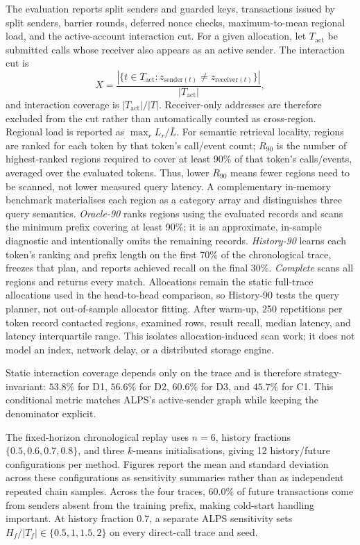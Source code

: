 \documentclass[runningheads]{llncs}
\begin{document}
The evaluation reports split senders and guarded keys, transactions issued by
split senders, barrier rounds, deferred nonce checks, maximum-to-mean regional
load, and the active-account interaction cut. For a given allocation, let
$T_{\mathrm{act}}$ be submitted calls whose receiver also appears as an active sender.
The interaction cut is
\[
X=\frac{|\{t\in T_{\mathrm{act}}:z_{\mathrm{sender}(t)}\neq
z_{\mathrm{receiver}(t)}\}|}{|T_{\mathrm{act}}|},
\]
and interaction coverage is $|T_{\mathrm{act}}|/|T|$. Receiver-only addresses
are therefore excluded from the cut rather than automatically counted as
cross-region. Regional load is reported as $\max_r L_r/\bar L$. For semantic
retrieval locality, regions are ranked for each token by that token's call/event
count; $R_{90}$ is the number of highest-ranked regions required to cover at
least 90\% of that token's calls/events, averaged over the evaluated tokens. Thus,
lower $R_{90}$ means fewer regions need to be scanned, not lower measured query
latency. A complementary in-memory benchmark materialises each region as a
category array and distinguishes three query semantics. \emph{Oracle-90}
ranks regions using the evaluated records and scans the minimum prefix covering
at least 90\%; it is an approximate, in-sample diagnostic and intentionally
omits the remaining records. \emph{History-90} learns each token's ranking and
prefix length on the first 70\% of the chronological trace, freezes that plan,
and reports achieved recall on the final 30\%. \emph{Complete} scans all regions
and returns every match. Allocations remain the static full-trace allocations
used in the head-to-head comparison, so History-90 tests the query planner, not
out-of-sample allocator fitting. After warm-up, 250 repetitions per token record
contacted regions, examined rows, result recall, median latency, and latency
interquartile range. This isolates allocation-induced scan work; it does not
model an index, network delay, or a distributed storage engine.

Static interaction coverage depends only on the trace and is therefore
strategy-invariant: $53.8\%$ for D1, $56.6\%$ for D2, $60.6\%$ for D3, and
$45.7\%$ for C1. This conditional metric matches ALPS's active-sender graph
while keeping the denominator explicit.

The fixed-horizon chronological replay uses $n=6$, history fractions
$\{0.5,0.6,0.7,0.8\}$, and three $k$-means initialisations, giving 12
history/future configurations per method. Figures report the mean and standard
deviation across these configurations as sensitivity summaries rather than as
independent repeated chain samples. Across the four traces, 60.0\% of future
transactions come from senders absent from the training prefix, making
cold-start handling important.
At history fraction $0.7$, a separate ALPS sensitivity sets
$H_f/|T_f|\in\{0.5,1,1.5,2\}$ on every direct-call trace and seed.
\end{document}

